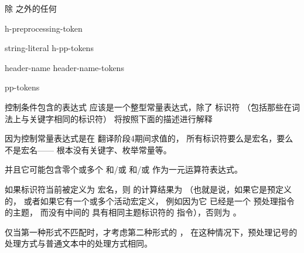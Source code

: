 \begin{bnf}
\br
    \textnormal{除 \terminal{>} 之外的任何 }
\end{bnf}

\begin{bnf}
\br
    h-preprocessing-token 
\end{bnf}

\begin{bnf}
    \br
        string-literal\br
        \terminal{<} h-pp-tokens \terminal{>}
    \end{bnf}
    
    \begin{bnf}
    \br
         \terminal{(} header-name \terminal{)}\br
         \terminal{(} header-name-tokens \terminal{)}
    \end{bnf}
    
    \begin{bnf}
    \br
         pp-tokens \terminal{)}
    \end{bnf}
    
    \pnum
    控制条件包含的表达式
    应该是一个整型常量表达式，除了
    标识符
    （包括那些在词法上与关键字相同的标识符）
    将按照下面的描述进行解释
    \begin{footnote}
    因为控制常量表达式是在
    翻译阶段4期间求值的，
    所有标识符要么是宏名，要么不是宏名——
    根本没有关键字、枚举常量等。
    \end{footnote}
    并且它可能包含零个或多个  和/或
     和/或
     作为一元运算符表达式。
    
    \pnum
    如果标识符当前被定义为
    宏名，则  的计算结果为 
    （也就是说，如果它是预定义的，
    或者如果它有一个或多个活动宏定义，
    例如因为它
    已经是一个
    预处理指令的主题，
    而没有中间的
    具有相同主题标识符的 
    指令），否则为 。
    
    \pnum
    仅当第一种形式不匹配时，才考虑第二种形式的 ，
    在这种情况下，预处理记号的处理方式与普通文本中的处理方式相同。
    
